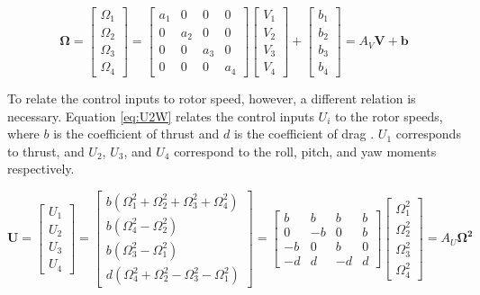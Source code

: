 \documentclass[12pt]{article}
\begin{document}
\begin{centering}
\begin{equation} \label{eq:V2W}
\bm{\Omega} =
\begin{bmatrix}
\Omega_1 \\ \Omega_2 \\ \Omega_3 \\ \Omega_4
\end{bmatrix}
=
\begin{bmatrix}
a_1 & 0 & 0 & 0\\
0 & a_2 & 0 & 0\\
0 & 0 & a_3 & 0\\
0 & 0 & 0 & a_4
\end{bmatrix}
\begin{bmatrix}
V_1 \\ V_2 \\ V_3 \\ V_4
\end{bmatrix}
+
\begin{bmatrix}
b_1 \\ b_2 \\ b_3 \\ b_4
\end{bmatrix}
=
A_V\bm{V} + \bm{b}
\end{equation}
\end{centering}

To relate the control inputs to rotor speed, however, a different relation is necessary. Equation \ref{eq:U2W} relates the control inputs $U_i$ to the rotor speeds, where $b$ is the coefficient of thrust and $d$ is the coefficient of drag \cite{twisty}. $U_1$ corresponds to thrust, and $U_2$, $U_3$, and $U_4$ correspond to the roll, pitch, and yaw moments respectively. 

\begin{centering}
\begin{equation} \label{eq:U2W}
\bm{U} = 
\begin{bmatrix}
U_1 \\ U_2 \\ U_3 \\ U_4
\end{bmatrix}
=
\begin{bmatrix}
b(\Omega_1^2 + \Omega_2^2 + \Omega_3^2 + \Omega_4^2)\\
b(\Omega_4^2-\Omega_2^2)\\
b(\Omega_3^2 - \Omega_1^2)\\
d(\Omega_4^2 + \Omega_2^2 - \Omega_3^2 - \Omega_1^2)
\end{bmatrix}
=
\begin{bmatrix}
b & b & b & b\\
0 & -b & 0 & b\\
-b & 0 & b & 0\\
-d & d & -d & d
\end{bmatrix}
\begin{bmatrix}
\Omega_1^2 \\ 
\Omega_2^2 \\
\Omega_3^2 \\
\Omega_4^2
\end{bmatrix}
=
A_U\bm{\Omega^2}
\end{equation}
\end{centering}
\end{document}
